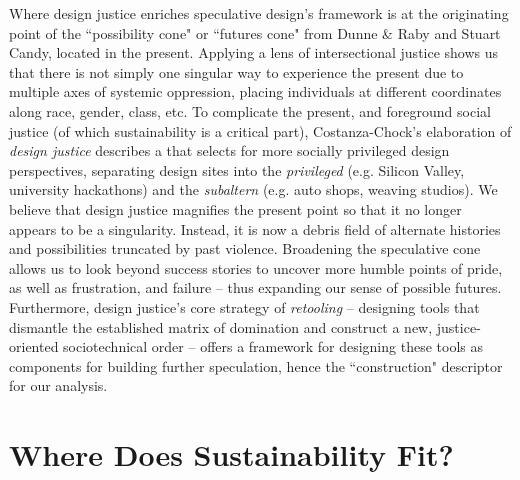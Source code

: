 Where design justice enriches speculative design's framework is at the originating point of %
the ``possibility cone" or ``futures cone" from Dunne \& Raby and Stuart Candy, located in the present. Applying a lens of intersectional justice shows us that there is not simply one singular way to experience the present due to multiple axes of systemic oppression, placing individuals at different coordinates along race, gender, class, etc. To complicate the present, and foreground social justice (of which sustainability is a critical part), Costanza-Chock's elaboration of \textit{design justice} \cite{costanza-chock_design_2020} describes a  that selects for more socially privileged design perspectives, separating design sites into the \textit{privileged} (e.g. Silicon Valley, university hackathons) and the \textit{subaltern} (e.g. auto shops, weaving studios). We believe that design justice magnifies the present point so that it no longer appears to be a singularity. Instead, it is now a debris field of alternate histories and possibilities truncated by past violence.
Broadening the speculative cone allows us to look beyond success stories to uncover more humble points of pride, as well as frustration, and failure -- thus expanding our sense of possible futures. Furthermore, design justice's core strategy of \textit{retooling} -- designing tools that dismantle the established matrix of domination and construct a new, justice-oriented sociotechnical order -- offers a framework for designing these tools as components for building further speculation, hence the ``construction" descriptor for our analysis.








\section{Where Does Sustainability Fit?}

